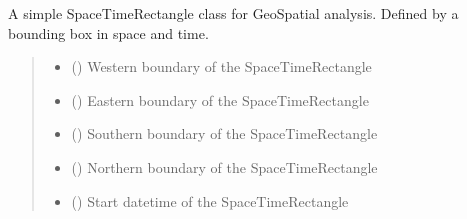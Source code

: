 \documentclass[letterpaper,10pt,english]{sphinxmanual}
\begin{document}
\begin{fulllineitems}
\begin{fulllineitems}
\begin{quote}
\begin{description}
\end{description}\end{quote}

\end{fulllineitems}


\end{fulllineitems}


\begin{fulllineitems}
\label{\detokenize{shape:GeoSpatialTools.shape.SpaceTimeRectangle}}
\pysigstartsignatures
\pysiglinewithargsret
{}
{\sphinxparamcomma {}\sphinxparamcomma {}\sphinxparamcomma {}\sphinxparamcomma {}\sphinxparamcomma {}}
{}
\pysigstopsignatures
\sphinxAtStartPar
A simple SpaceTimeRectangle class for GeoSpatial analysis. Defined by a
bounding box in space and time.
\begin{quote}\begin{description}
\begin{itemize}
\item {} 
\sphinxAtStartPar
{} () \textendash{} Western boundary of the SpaceTimeRectangle

\item {} 
\sphinxAtStartPar
{} () \textendash{} Eastern boundary of the SpaceTimeRectangle

\item {} 
\sphinxAtStartPar
{} () \textendash{} Southern boundary of the SpaceTimeRectangle

\item {} 
\sphinxAtStartPar
{} () \textendash{} Northern boundary of the SpaceTimeRectangle

\item {} 
\sphinxAtStartPar
{} () \textendash{} Start datetime of the SpaceTimeRectangle


\end{itemize}
\end{description}
\end{quote}
\end{fulllineitems}
\end{document}
